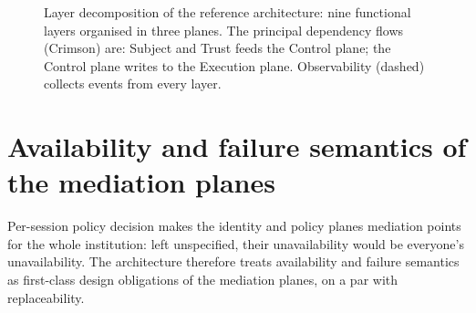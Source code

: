 \begin{figure}[H]
\caption{Layer decomposition of the reference architecture: nine
functional layers organised in three planes. The principal
dependency flows (Crimson) are: Subject and Trust feeds the
Control plane; the Control plane writes to the Execution plane.
Observability (dashed) collects events from every layer.}
\label{fig:ap-layers}
\end{figure}

\section{Availability and failure semantics of the mediation planes}
\label{sec:ap-availability}

Per-session policy decision makes the identity and policy planes
mediation points for the whole institution: left unspecified, their
unavailability would be everyone's unavailability. The architecture
therefore treats availability and failure semantics as first-class
design obligations of the mediation planes, on a par with
replaceability.

